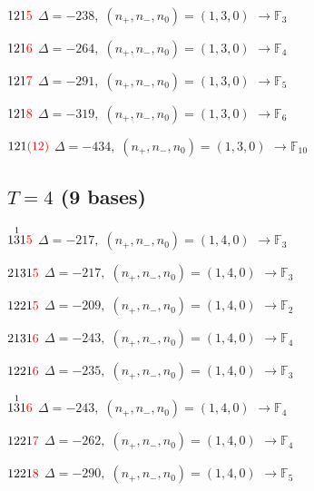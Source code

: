 \documentclass[10pt]{article}
\begin{document}
$121\textcolor{red}{5}$ \quad $\Delta=-238,\; (n_+,n_-,n_0)=(1,3,0)$ \quad $\to \mathbb{F}_{3}$

$121\textcolor{red}{6}$ \quad $\Delta=-264,\; (n_+,n_-,n_0)=(1,3,0)$ \quad $\to \mathbb{F}_{4}$

$121\textcolor{red}{7}$ \quad $\Delta=-291,\; (n_+,n_-,n_0)=(1,3,0)$ \quad $\to \mathbb{F}_{5}$

$121\textcolor{red}{8}$ \quad $\Delta=-319,\; (n_+,n_-,n_0)=(1,3,0)$ \quad $\to \mathbb{F}_{6}$

$121\textcolor{red}{(12)}$ \quad $\Delta=-434,\; (n_+,n_-,n_0)=(1,3,0)$ \quad $\to \mathbb{F}_{10}$


\subsection*{$T = 4$ \quad (9 bases)}
\smallskip

$1\overset{1}{3}1\textcolor{red}{5}$ \quad $\Delta=-217,\; (n_+,n_-,n_0)=(1,4,0)$ \quad $\to \mathbb{F}_{3}$

\smallskip

$2131\textcolor{red}{5}$ \quad $\Delta=-217,\; (n_+,n_-,n_0)=(1,4,0)$ \quad $\to \mathbb{F}_{3}$

\smallskip

$1221\textcolor{red}{5}$ \quad $\Delta=-209,\; (n_+,n_-,n_0)=(1,4,0)$ \quad $\to \mathbb{F}_{2}$

\smallskip

$2131\textcolor{red}{6}$ \quad $\Delta=-243,\; (n_+,n_-,n_0)=(1,4,0)$ \quad $\to \mathbb{F}_{4}$

\smallskip

$1221\textcolor{red}{6}$ \quad $\Delta=-235,\; (n_+,n_-,n_0)=(1,4,0)$ \quad $\to \mathbb{F}_{3}$

\smallskip

$1\overset{1}{3}1\textcolor{red}{6}$ \quad $\Delta=-243,\; (n_+,n_-,n_0)=(1,4,0)$ \quad $\to \mathbb{F}_{4}$

\smallskip

$1221\textcolor{red}{7}$ \quad $\Delta=-262,\; (n_+,n_-,n_0)=(1,4,0)$ \quad $\to \mathbb{F}_{4}$

$1221\textcolor{red}{8}$ \quad $\Delta=-290,\; (n_+,n_-,n_0)=(1,4,0)$ \quad $\to \mathbb{F}_{5}$
\end{document}

